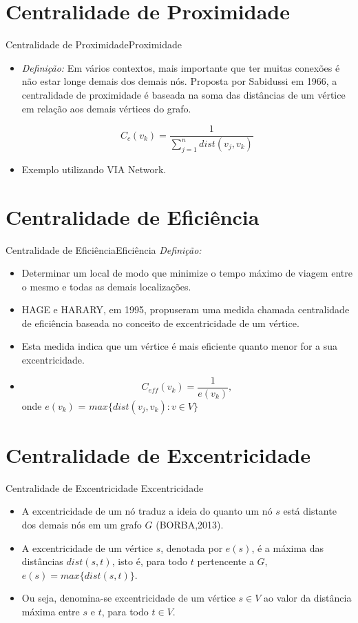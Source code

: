 \documentclass[10pt]{beamer}
\begin{document}
\section{Centralidade de Proximidade}
\begin{frame}{Centralidade de Proximidade}{Proximidade}
\begin{itemize}
\item \textit{Definição:} Em vários contextos, mais importante que ter muitas conexões é não estar longe demais dos demais nós. Proposta por Sabidussi em 1966, a centralidade de proximidade é baseada na soma das distâncias de um vértice em relação aos demais vértices do grafo.

\begin{equation}
C_c(v_k) = \frac{1}{\sum_{j = 1}^n dist(v_j,v_k)} 
\end{equation}
\item Exemplo utilizando VIA Network.
\end{itemize}
\end{frame}


\section{Centralidade de Eficiência}
\begin{frame}{Centralidade de Eficiência}{Eficiência}
\textit{Definição: }
\begin{itemize}
\item Determinar um local de modo que minimize o tempo máximo de viagem entre o mesmo e todas as demais localizações.
\item HAGE e HARARY, em 1995, propuseram uma medida chamada centralidade de eficiência baseada  no  conceito  de  excentricidade  de  um  vértice.
\item Esta medida indica que um vértice é mais eficiente quanto menor for a sua excentricidade.
\item \begin{equation}
C_{eff}(v_k)= \frac{1}{e(v_k)},
\end{equation}
onde $e(v_k)$ = $max\{dist(v_j,v_k):v \in V\}$
\end{itemize}
\end{frame}

\section{Centralidade de Excentricidade}
\begin{frame}{Centralidade de Excentricidade }{Excentricidade}
\begin{itemize}
\item A excentricidade de um nó traduz a ideia do quanto um nó $s$ está distante dos demais nós em um grafo $G$ (BORBA,2013).
\item A excentricidade de um vértice $s$, denotada por $e(s)$, é a máxima das distâncias $dist(s,t)$, isto é, para todo $t$ pertencente a $G$, $e(s)= max\{dist(s,t)\}$.
\item Ou seja, denomina-se excentricidade de um vértice $s \in V$ ao valor da distância máxima entre $s$ e $t$, para todo $t \in V$.
\end{itemize}
\end{frame}
\end{document}
